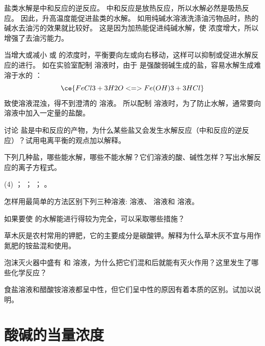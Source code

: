 盐类水解是中和反应的逆反应。
中和反应是放热反应，所以水解必然是吸热反应。
因此，升高温度能促进盐类的水解。
如用纯碱水溶液洗涤油污物品时，热的碱水去油污的效果就比较好。
这是因为加热能促进纯碱水解，使  浓度增大，所以增强了去油污能力。

当增大或减小  或  的浓度时，平衡要向左或向右移动，这样可以抑制或促进水解反应的进行。
如在实验室配制  溶液时，由于  是强酸弱碱生成的盐，容易水解生成难溶于水的 ：
\[ \ce{ FeCl3 + 3H2O <=> Fe(OH)3 + 3HCl }\]
致使溶液混浊，得不到澄清的  溶液。
所以配制  溶液时，为了防止水解，通常要向溶液中加入一定量的盐酸。

\begin{Theorem}{讨论}
  盐是中和反应的产物，为什么某些盐又会发生水解反应（中和反应的逆反应）？试用电离平衡的观点加以解释。
\end{Theorem}

\begin{Practice}[习题]
\begin{question}
  \item 下列几种盐，哪些能水解，哪些不能水解？它们溶液的酸、碱性怎样？写出水解反应的离子方程式。
  \begin{tasks}(4)
    \task {}；
    \task {}；
    \task {}；
    \task {}。
  \end{tasks}
  \item 怎样用最简单的方法区别下列三种溶液:  溶液、  溶液和  溶液。
  \item 如果要使  的水解能进行得较为完全，可以采取哪些措施？
  \item 草木灰是农村常用的钾肥，它的主要成分是碳酸钾。解释为什么草木灰不宜与用作氮肥的铵盐混和使用。
  \item 泡沫灭火器中盛有  和  溶液，为什么把它们混和后就能有灭火作用？这里发生了哪些化学反应？
  \item 食盐溶液和醋酸铵溶液都呈中性，但它们呈中性的原因有着本质的区别。试加以说明。
\end{question}
\end{Practice}

\section{酸碱的当量浓度}
